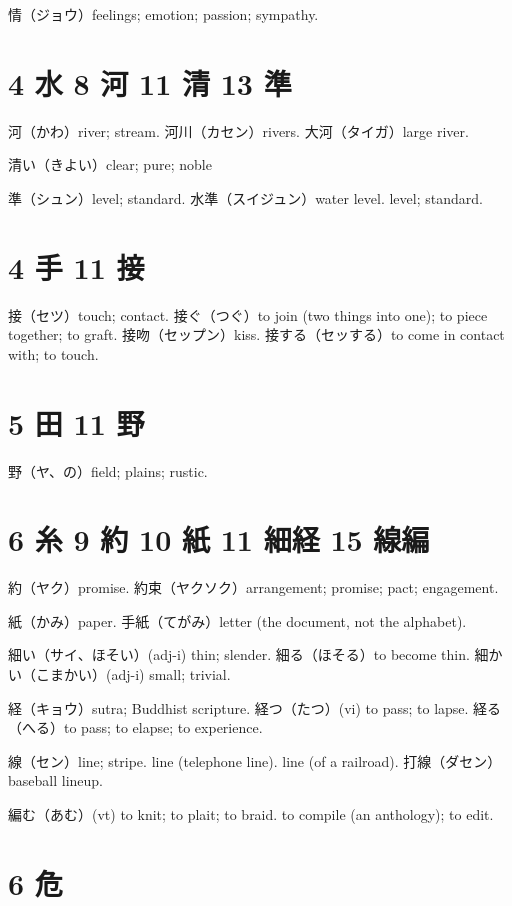 情（ジョウ）feelings; emotion; passion; sympathy.

\section{4 水 8 河 11 清 13 準}

河（かわ）river; stream.
河川（カセン）rivers.
大河（タイガ）large river.

清い（きよい）clear; pure; noble

準（シュン）level; standard.
水準（スイジュン）water level. level; standard.

\section{4 手 11 接}

接（セツ）touch; contact.
接ぐ（つぐ）to join (two things into one); to piece together; to graft.
接吻（セップン）kiss.
接する（セッする）to come in contact with; to touch.

\section{5 田 11 野}

野（ヤ、の）field; plains; rustic.

\section{6 糸 9 約 10 紙 11 細経 15 線編}

約（ヤク）promise.
約束（ヤクソク）arrangement; promise; pact; engagement.

紙（かみ）paper.
手紙（てがみ）letter (the document, not the alphabet).

細い（サイ、ほそい）(adj-i) thin; slender.
細る（ほそる）to become thin.
細かい（こまかい）(adj-i) small; trivial.

経（キョウ）sutra; Buddhist scripture.
経つ（たつ）(vi) to pass; to lapse.
経る（へる）to pass; to elapse; to experience.

線（セン）line; stripe.
line (telephone line).
line (of a railroad).
打線（ダセン）baseball lineup.

編む（あむ）(vt)
to knit; to plait; to braid.
to compile (an anthology); to edit.

\section{6 危}

